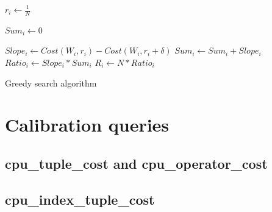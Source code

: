 \documentclass[jidm,a4paper]{jidm} %
\begin{document}
\begin{algorithm}[H]
 \begin{algorithmic}
	\STATE $r_{i} \gets \frac{1}{N}$
    \ENDFOR
    
    \STATE $ Sum_{i} \gets 0 $
	\STATE {}

	\STATE $ Slope_{i} \gets Cost(W_{i},r_{i}) - Cost(W_{i},r_{i} + \delta)$
	\STATE $ Sum_{i} \gets Sum_{i} + Slope_{i} $
    \ENDFOR
	\STATE {}
	\STATE $ Ratio_{i} \gets Slope_{i} * Sum_{i} $
	\STATE $ R_{i} \gets N*Ratio_{i} $
    \ENDFOR

 \end{algorithmic}
  \caption{Greedy search algorithm}
\end{algorithm}

\section{Calibration queries}

\subsection{cpu\_tuple\_cost and cpu\_operator\_cost}
\label{app:cal1}


\subsection{cpu\_index\_tuple\_cost}
\label{app:cal2}


	



\begin{received}
\end{received}
\end{document}

